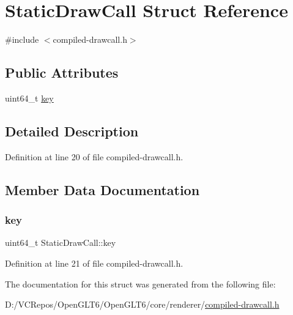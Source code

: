 \hypertarget{struct_static_draw_call}{}\section{Static\+Draw\+Call Struct Reference}
\label{struct_static_draw_call}


{\ttfamily \#include $<$compiled-\/drawcall.\+h$>$}

\subsection*{Public Attributes}
\begin{DoxyCompactItemize}
\item 
uint64\+\_\+t \mbox{\hyperlink{struct_static_draw_call_a7c25461514f7adaec6caa01509ba3597}{key}}
\end{DoxyCompactItemize}


\subsection{Detailed Description}


Definition at line 20 of file compiled-\/drawcall.\+h.



\subsection{Member Data Documentation}
\mbox{\label{struct_static_draw_call_a7c25461514f7adaec6caa01509ba3597}} 
\subsubsection{\texorpdfstring{key}{key}}
{\footnotesize\ttfamily uint64\+\_\+t Static\+Draw\+Call\+::key}



Definition at line 21 of file compiled-\/drawcall.\+h.



The documentation for this struct was generated from the following file\+:\begin{DoxyCompactItemize}
\item 
D\+:/\+V\+C\+Repos/\+Open\+G\+L\+T6/\+Open\+G\+L\+T6/core/renderer/\mbox{\hyperlink{compiled-drawcall_8h}{compiled-\/drawcall.\+h}}\end{DoxyCompactItemize}

